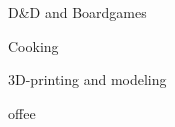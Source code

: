 \begin{zitemize}
\item D\&D and Boardgames
\item Cooking
\item 3D-printing and modeling
\item offee
\end{zitemize}
